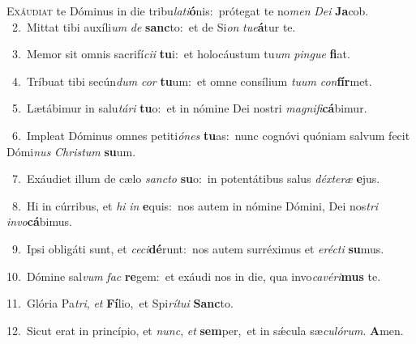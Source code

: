 \lettrine{\initial\textcolor{\initialcolor}{E}}{xáudiat} te Dóminus in die tribu\-\textit{la}\-\textit{ti}\textbf{ó}nis:~\star prótegat te no\textit{men} \textit{De}\-\textit{i} \textbf{Ja}\-cob.\\
{\numbfont\textcolor{\numbcolor}{~2.}}~Mittat tibi auxíli\textit{um} \textit{de} \textbf{sanc}\-to:~\star et de Si\textit{on} \textit{tu}\-\textit{e}\textbf{á}tur te.\par
{\numbfont\textcolor{\numbcolor}{~3.}}~Memor sit omnis sacrifí\-\textit{ci}\-\textit{i} \textbf{tu}\-i:~\star et holocáustum tu\textit{um} \textit{pin}\-\textit{gue} \textbf{fi}\-at.\par
{\numbfont\textcolor{\numbcolor}{~4.}}~Tríbuat tibi secún\textit{dum} \textit{cor} \textbf{tu}\-um:~\star et omne consílium \textit{tu}\-\textit{um} \textit{con}\-\textbf{fír}met.\par
{\numbfont\textcolor{\numbcolor}{~5.}}~Lætábimur in salu\-\textit{tá}\-\textit{ri} \textbf{tu}\-o:~\star et in nómine Dei nostri \textit{ma}\-\textit{gni}\textit{fi}\textbf{cá}bimur.\par
{\numbfont\textcolor{\numbcolor}{~6.}}~Impleat Dóminus omnes petiti\-\textit{ó}\-\textit{nes} \textbf{tu}\-as:~\star nunc cognóvi quóniam salvum fecit Dómi\textit{nus} \textit{Chris}\-\textit{tum} \textbf{su}\-um.\par
{\numbfont\textcolor{\numbcolor}{~7.}}~Exáudiet illum de cælo \textit{sanc}\-\textit{to} \textbf{su}\-o:~\star in potentátibus salus \textit{déx}\-\textit{te}\textit{ræ} \textbf{e}\-jus.\par
{\numbfont\textcolor{\numbcolor}{~8.}}~Hi in cúrribus, et \textit{hi} \textit{in} \textbf{e}\-quis:~\star nos autem in nómine Dómini, Dei nos\textit{tri} \textit{in}\-\textit{vo}\textbf{cá}bimus.\par
{\numbfont\textcolor{\numbcolor}{~9.}}~Ipsi obligáti sunt, et \textit{ce}\-\textit{ci}\textbf{dé}runt:~\star nos autem surréximus et \textit{e}\-\textit{réc}\textit{ti} \textbf{su}\-mus.\par
{\numbfont\textcolor{\numbcolor}{10.}}~Dómine sal\textit{vum} \textit{fac} \textbf{re}\-gem:~\star et exáudi nos in die, qua invo\-\textit{ca}\-\textit{vé}\textit{ri}\textbf{mus} te.\par
{\numbfont\textcolor{\numbcolor}{11.}}~Glória Pa\-\textit{tri}\-, \textit{et} \textbf{Fí}\-lio,~\star et Spi\-\textit{rí}\-\textit{tu}\textit{i} \textbf{Sanc}\-to.\par
{\numbfont\textcolor{\numbcolor}{12.}}~Sicut erat in princípio, et \textit{nunc}\-, \textit{et} \textbf{sem}\-per,~\star et in sǽcula sæ\-\textit{cu}\-\textit{ló}\textit{rum}. \textbf{A}\-men.\par

